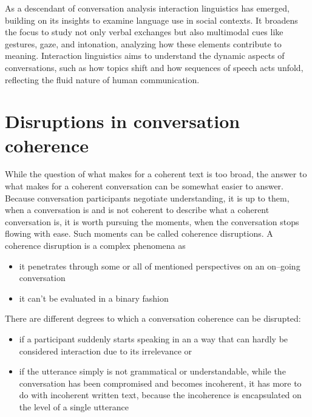 \documentclass[12pt]{report}
\begin{document}
{\par
As a descendant of conversation analysis interaction linguistics has emerged,
building on its insights to examine language use in social contexts.
It broadens the focus to study not only verbal exchanges but also
multimodal cues like gestures, gaze, and intonation,
analyzing how these elements contribute to meaning.
Interaction linguistics aims to understand the dynamic aspects of conversations,
such as how topics shift and how sequences of speech acts unfold,
reflecting the fluid nature of human communication.

\section{Disruptions in conversation coherence}
\par
While the question of what makes for a coherent text is too broad,
the answer to what makes for a coherent conversation can be somewhat easier to answer.
Because conversation participants negotiate understanding,
it is up to them, when a conversation is and is not coherent
to describe what a coherent conversation is,
it is worth pursuing the moments, when the conversation stops flowing with ease.
Such moments can be called coherence disruptions.
A coherence disruption is a complex phenomena as

\begin{itemize}
\item
it penetrates through some or all of mentioned perspectives on an on–going conversation
\item
it can't be evaluated in a binary fashion
\end{itemize}

There are different degrees to which a conversation coherence can be disrupted:
\begin{itemize}

\item
   if a participant suddenly starts speaking
    in an a way that can hardly be considered interaction
    due to its irrelevance or

\item
   if the utterance simply is not grammatical or understandable,
    while the conversation has been compromised and becomes incoherent,
    it has more to do with incoherent written text, because
    the incoherence is encapsulated on the level of a single utterance
\end{itemize}

}
\end{document}
